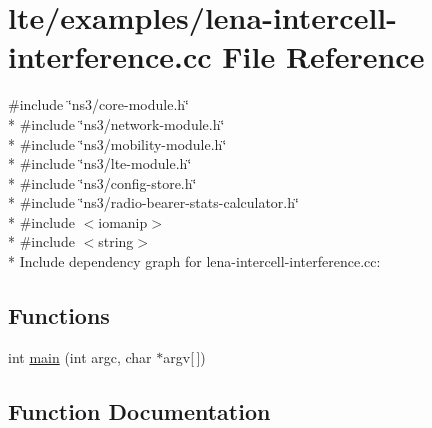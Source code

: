 \hypertarget{lena-intercell-interference_8cc}{}\section{lte/examples/lena-\/intercell-\/interference.cc File Reference}
\label{lena-intercell-interference_8cc}
{\ttfamily \#include \char`\"{}ns3/core-\/module.\+h\char`\"{}}\\*
{\ttfamily \#include \char`\"{}ns3/network-\/module.\+h\char`\"{}}\\*
{\ttfamily \#include \char`\"{}ns3/mobility-\/module.\+h\char`\"{}}\\*
{\ttfamily \#include \char`\"{}ns3/lte-\/module.\+h\char`\"{}}\\*
{\ttfamily \#include \char`\"{}ns3/config-\/store.\+h\char`\"{}}\\*
{\ttfamily \#include \char`\"{}ns3/radio-\/bearer-\/stats-\/calculator.\+h\char`\"{}}\\*
{\ttfamily \#include $<$iomanip$>$}\\*
{\ttfamily \#include $<$string$>$}\\*
Include dependency graph for lena-\/intercell-\/interference.cc\+:
\subsection*{Functions}
\begin{DoxyCompactItemize}
\item 
int \hyperlink{lena-intercell-interference_8cc_a0ddf1224851353fc92bfbff6f499fa97}{main} (int argc, char $\ast$argv\mbox{[}$\,$\mbox{]})
\end{DoxyCompactItemize}


\subsection{Function Documentation}
